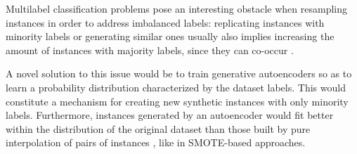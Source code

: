 Multilabel classification problems pose an interesting obstacle when resampling instances in order to address imbalanced labels: replicating instances with minority labels or generating similar ones usually also implies increasing the amount of instances with majority labels, since they can co-occur . 

A novel solution to this issue would be to train generative autoencoders so as to learn a probability distribution characterized by the dataset labels. This would constitute a mechanism for creating new synthetic instances with only minority labels. Furthermore, instances generated by an autoencoder would fit better within the distribution of the original dataset than those built by pure interpolation of pairs of instances , like in SMOTE-based approaches.

